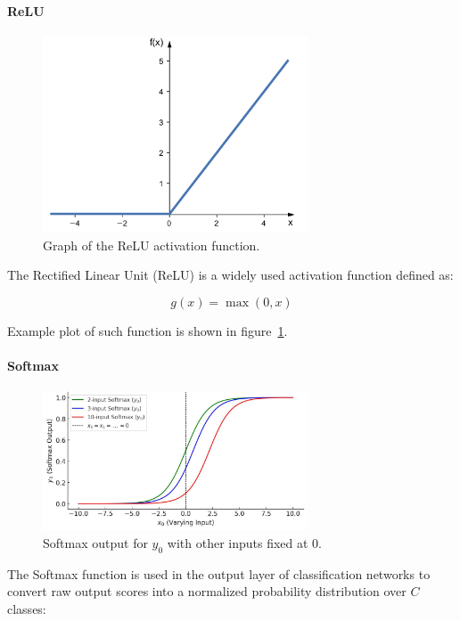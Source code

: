 \documentclass{pracalicmgr}
\begin{document}
\paragraph{ReLU}

\begin{figure}[H]
\centering
\includegraphics[width=0.7\textwidth]{src/relu.png}
\caption{Graph of the ReLU activation function.}
\label{fig:relu}
\end{figure}

The Rectified Linear Unit (ReLU) is a widely used activation function defined as:

\[
g(x) = \max(0, x)
\]

Example plot of such function is shown in figure~\ref{fig:relu}.

\paragraph{Softmax}

\begin{figure}[H]
\centering
\includegraphics[width=0.7\textwidth]{src/softmax.pdf}
\caption{Softmax output for $y_0$ with other inputs fixed at 0.}
\label{fig:softmax}
\end{figure}

The Softmax function is used in the output layer of classification networks to convert raw output scores into a normalized probability distribution over \( C \) classes:
\end{document}

